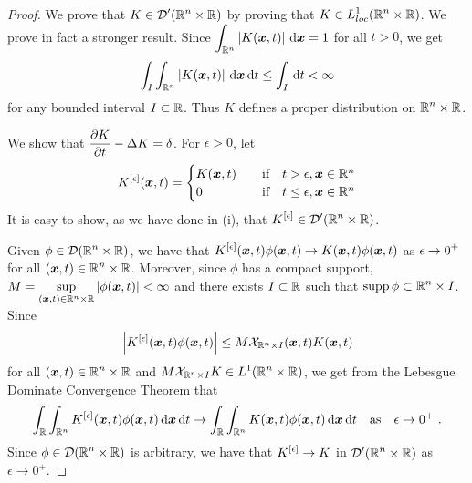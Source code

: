 \begin{proof}
 We prove that $\displaystyle K\in \mathcal{D}'(\mathbb{R}^n\times \mathbb{R})$ by
proving that $\displaystyle K \in L^1_{loc}(\mathbb{R}^n \times \mathbb{R})$.  We
prove in fact a stronger result.  Since
$\displaystyle \int_{\mathbb{R}^n} \left| K({\bm{x}},t) \right| \,\mathrm{d}{{\bm{x}}} = 1$
for all $t>0$, we get
\[
\int_I \int_{\mathbb{R}^n} \left| K({\bm{x}},t) \right| \,\mathrm{d}{{\bm{x}}} \,\mathrm{d}{t}
\leq \int_I \,\mathrm{d}{t} < \infty
\]
for any bounded interval $I \subset \mathbb{R}$.  Thus $K$ defines a proper
distribution on $\displaystyle \mathbb{R}^n \times \mathbb{R}$.

 We show that
$\displaystyle \frac{\partial{K}}{\partial t} - \Delta K = \delta$.  For $\epsilon>0$,
let
\[
K^{[\epsilon]}({\bm{x}},t) =
\begin{cases}
K({\bm{x}}, t) & \quad \text{if} \quad t > \epsilon, {\bm{x}} \in \mathbb{R}^n \\
0 & \quad \text{if} \quad t \leq \epsilon, {\bm{x}} \in \mathbb{R}^n \\
\end{cases}
\]
It is easy to show, as we have done in (i), that
$\displaystyle K^{[\epsilon]}\in \mathcal{D}'(\mathbb{R}^n\times \mathbb{R})$.

Given $\displaystyle \phi \in \mathcal{D}(\mathbb{R}^n \times \mathbb{R})$,
we have that $\displaystyle K^{[\epsilon]}({\bm{x}},t) \phi({\bm{x}},t)
\rightarrow K({\bm{x}},t) \phi({\bm{x}},t)$ as
$\displaystyle \epsilon \rightarrow 0^+$ for all
$\displaystyle ({\bm{x}},t) \in \mathbb{R}^n\times \mathbb{R}$.
Moreover, since $\phi$ has a compact support,
$\displaystyle M = \sup_{({\bm{x}},t) \in \mathbb{R}^n \times \mathbb{R}} |\phi({\bm{x}},t)|
< \infty$ and there exists $I \subset \mathbb{R}$ such that
$\displaystyle \operatorname{supp} \phi \subset \mathbb{R}^n \times I$. 
Since
\[
\left| K^{[\epsilon]}({\bm{x}},t) \phi({\bm{x}},t) \right|
\leq M \mathcal{X}_{\mathbb{R}^n \times I}({\bm{x}},t) K({\bm{x}},t)
\]
for all $\displaystyle ({\bm{x}},t) \in \mathbb{R}^n\times \mathbb{R}$ and
$\displaystyle M \mathcal{X}_{\mathbb{R}^n \times I} K \in L^1(\mathbb{R}^n \times \mathbb{R})$,
we get from the Lebesgue Dominate Convergence Theorem that
\[
\int_{\mathbb{R}} \int_{\mathbb{R}^n} K^{[\epsilon]}({\bm{x}},t) \phi({\bm{x}},t)
\,\mathrm{d}{{\bm{x}}}\,\mathrm{d}{t} \to
\int_{\mathbb{R}} \int_{\mathbb{R}^n} K({\bm{x}},t) \phi({\bm{x}},t)
\,\mathrm{d}{{\bm{x}}}\,\mathrm{d}{t} \quad \text{as} \quad \epsilon \to 0^+ \ .
\]
Since $\displaystyle \phi \in \mathcal{D}(\mathbb{R}^n \times \mathbb{R})$ is arbitrary,
we have that $\displaystyle K^{[\epsilon]} \rightarrow K$ in
$\displaystyle \mathcal{D}'(\mathbb{R}^n\times \mathbb{R})$ as $\epsilon \rightarrow 0^+$.


\end{proof}
